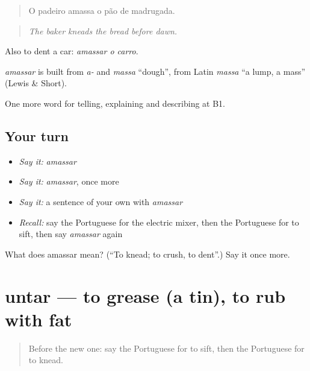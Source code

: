 \begin{quote}
O padeiro amassa o pão de madrugada.
\end{quote}

\begin{quote}
\emph{The baker kneads the bread before dawn.}
\end{quote}

Also to dent a car: \emph{amassar o carro}.

\begin{cousinweb}
\emph{amassar} is built from \emph{a-} and \emph{massa} \textquotedblleft{}dough\textquotedblright{}, from Latin \emph{massa} \textquotedblleft{}a lump, a mass\textquotedblright{} (Lewis \& Short).
\end{cousinweb}

\begin{grammarlens}[title={What you've built}]
One more word for telling, explaining and describing at B1.
\end{grammarlens}

\subsection*{Your turn}
\begin{itemize}
\raggedright
  \item \emph{Say it:} \emph{amassar}
  \item \emph{Say it:} \emph{amassar}, once more
  \item \emph{Say it:} a sentence of your own with \emph{amassar}
  \item \emph{Recall:} say the Portuguese for the electric mixer, then the Portuguese for to sift, then say \emph{amassar} again
\end{itemize}

\begin{tcolorbox}[breakable,colback=teal!4,colframe=teal!35!black,title={Before you move on}]
What does amassar mean? (\textquotedblleft{}To knead; to crush, to dent\textquotedblright{}.) Say it once more.
\end{tcolorbox}
\section[untar]{untar — to grease (a tin), to rub with fat}

\label{lesson:PT-C333-untar}



\begin{quote}
Before the new one: say the Portuguese for to sift, then the Portuguese for to knead.
\end{quote}

